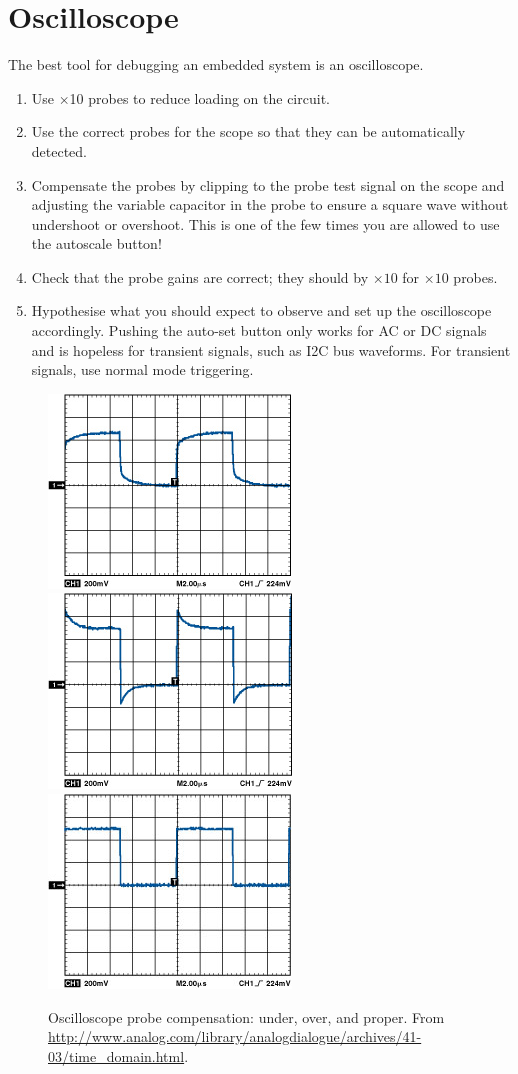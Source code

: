 \section{Oscilloscope}
\label{oscilloscope}

The best tool for debugging an embedded system is an oscilloscope.

\begin{enumerate}
\item  Use $\times$10 probes to reduce loading on the circuit.

\item Use the correct probes for the scope so that they can be automatically
  detected.
  
\item Compensate the probes by clipping to the probe test signal on
  the scope and adjusting the variable capacitor in the probe to
  ensure a square wave without undershoot or overshoot. This is one of
  the few times you are allowed to use the autoscale button!

\item Check that the probe gains are correct; they should by $\times
  10$ for $\times 10$ probes.
  
\item Hypothesise what you should expect to observe and set up the
  oscilloscope accordingly.  Pushing the auto-set button only works
  for AC or DC signals and is hopeless for transient signals, such as
  I2C bus waveforms.  For transient signals, use normal mode triggering.

\end{enumerate}

\begin{figure}[!h]
  \centering
  \includegraphics[width=0.3\columnwidth]{figs/probe-undercompensated}
  \includegraphics[width=0.3\columnwidth]{figs/probe-overcompensated}
  \includegraphics[width=0.3\columnwidth]{figs/probe-compensated}
  \caption{Oscilloscope probe compensation: under, over, and proper.
    From
    \url{http://www.analog.com/library/analogdialogue/archives/41-03/time_domain.html}.}
\end{figure}


